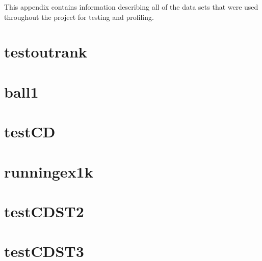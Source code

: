 This appendix contains information describing all of the data sets that were
used throughout the project for testing and profiling.

\section{testoutrank}
\label{dataSets:testoutrank}

\section{ball1}
\label{dataSets:ball1}

\section{testCD}
\label{dataSets:testCD}

\section{runningex1k}
\label{dataSets:runningex1k}

\section{testCDST2}
\label{sec:dataSets:testCDST2}

\section{testCDST3}
\label{sec:dataSets:testCDST3}

